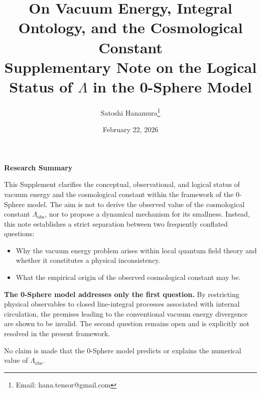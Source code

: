 \documentclass[12pt,letterpaper]{article}
\begin{document}
\title{On Vacuum Energy, Integral Ontology, and the Cosmological Constant\\
\normalsize Supplementary Note on the Logical Status of $\Lambda$ in the 0-Sphere Model}

\author{Satoshi Hanamura\thanks{Email: hana.tensor@gmail.com}}
\date{February 22, 2026}

\maketitle

\tableofcontents



\begin{center}
\textbf{Research Summary}
\end{center}

\justifying

This Supplement clarifies the conceptual, observational, and logical status of vacuum energy and the cosmological constant within the framework of the 0-Sphere model. The aim is not to derive the observed value of the cosmological constant $\Lambda_{\mathrm{obs}}$, nor to propose a dynamical mechanism for its smallness. Instead, this note establishes a strict separation between two frequently conflated questions:

\begin{itemize}
\item[(i)] Why the vacuum energy problem arises within local quantum field theory and whether it constitutes a physical inconsistency.
\item[(ii)] What the empirical origin of the observed cosmological constant may be.
\end{itemize}

\textbf{The 0-Sphere model addresses only the first question.} By restricting physical observables to closed line-integral processes associated with internal circulation, the premises leading to the conventional vacuum energy divergence are shown to be invalid. The second question remains open and is explicitly not resolved in the present framework.

No claim is made that the 0-Sphere model predicts or explains the numerical value of $\Lambda_{\mathrm{obs}}$.
\end{document}
